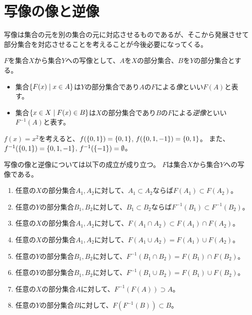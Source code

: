 \section{写像の像と逆像}

写像は集合の元を別の集合の元に対応させるものであるが、そこから発展させて部分集合を対応させることを考えることが今後必要になってくる。

\begin{definition}[写像の像と逆像]
$F$を集合$X$から集合$Y$への写像として、$A$を$X$の部分集合、$B$を$Y$の部分集合とする。
\begin{itemize}
\item
集合$\{ F(x) \mid x \in A \}$は$Y$の部分集合であり$A$の$F$による\emph{像}といい$F(A)$と表す。
\item
集合$\{ x \in X \mid F(x) \in B \}$は$X$の部分集合であり$B$の$F$による\emph{逆像}といい$F^{-1}(A)$と表す。
\end{itemize}
\end{definition}

\begin{example}
$f(x) = x^2$を考えると、$f(\{0, 1\}) = \{0, 1\}$, $f(\{0, 1, -1\}) = \{0, 1\}$。
また、$f^{-1}(\{0, 1\}) = \{0, 1, -1\}$, $f^{-1}(\{-1\}) = \emptyset$。
\end{example}

写像の像と逆像については以下の成立が成り立つ。
$F$は集合$X$から集合$Y$への写像である。
\begin{enumerate}
\item
任意の$X$の部分集合$A_1, A_2$に対して、$A_1 \subset A_2$ならば$F(A_1) \subset F(A_2)$。
\item
任意の$Y$の部分集合$B_1, B_2$に対して、$B_1 \subset B_2$ならば$F^{-1}(B_1) \subset F^{-1}(B_2)$。
\item
任意の$X$の部分集合$A_1, A_2$に対して、$F(A_1\cap A_2) \subset F(A_1)\cap F(A_2)$。
\item
任意の$X$の部分集合$A_1, A_2$に対して、$F(A_1\cup A_2) = F(A_1)\cup F(A_2)$。
\item
任意の$Y$の部分集合$B_1, B_2$に対して、$F^{-1}(B_1\cap B_2) = F(B_1)\cap F(B_2)$。
\item
任意の$Y$の部分集合$B_1, B_2$に対して、$F^{-1}(B_1\cup B_2) = F(B_1)\cup F(B_2)$。
\item
任意の$X$の部分集合$A$に対して、$F^{-1}(F(A)) \supset A$。
\item
任意の$Y$の部分集合$B$に対して、$F(F^{-1}(B)) \subset B$。
\end{enumerate}

